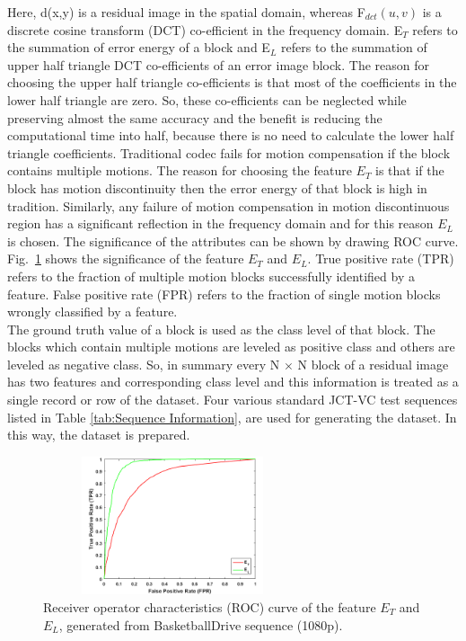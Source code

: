 \documentclass{article}
\begin{document}
Here, d(x,y) is a residual image in the spatial domain, whereas F$_{dct}(u,v)$ is a discrete cosine transform (DCT) co-efficient in the frequency domain. E$_{T}$ refers to the summation of error energy of a block and E$_{L}$ refers to the summation of upper half triangle DCT co-efficients of an error image block. The reason for choosing the upper half triangle co-efficients is that most of the coefficients in the lower half triangle are zero. So, these co-efficients can be neglected while preserving almost the same accuracy and the benefit is reducing the computational time into half, because there is no need to calculate the lower half triangle coefficients. Traditional codec fails for motion compensation if the block contains multiple motions. The reason for choosing the feature $E_{T}$ is that if the block has motion discontinuity then the error energy of that block is high in tradition. Similarly, any failure of motion compensation in motion discontinuous region has a significant reflection in the frequency domain and for this reason $E_{L}$ is chosen. The significance of the attributes can be shown by drawing ROC curve. Fig.~\ref{fig:ROC} shows the significance of the feature $E_{T}$ and $E_{L}$. True positive rate (TPR) refers to the fraction of multiple motion blocks successfully identified by a feature. False positive rate (FPR) refers to the fraction of single motion blocks wrongly classified by a feature. \\

The ground truth value of a block is used as the class level of that block. The blocks which contain multiple motions are leveled as positive class and others are leveled as negative class. So, in summary every N $\times$ N block of a residual image has two features and corresponding class level and this information is treated as a single record or row of the dataset. Four various standard JCT-VC test sequences listed in Table \ref{tab:Sequence Information}, are used for generating the dataset. In this way, the dataset is prepared. 

\begin{figure}[t]
	\centering
	\includegraphics[width=3in, height= 1.6in]{Figures/ROC_Curve_Final}
	\caption{Receiver operator characteristics (ROC) curve of the feature $E_{T}$ and $E_{L}$, generated from BasketballDrive sequence (1080p). }
	\vspace{-1.5mm}
	\label{fig:ROC}
\end{figure}
\end{document}

